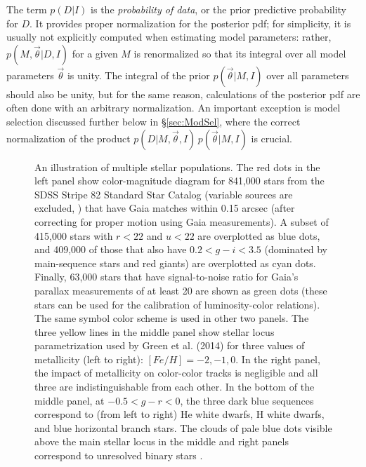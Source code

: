 The term $p(D|I)$ is the {\it probability of data}, or the prior predictive probability for $D$. 
It provides proper normalization for the posterior  pdf; for simplicity, it is usually not explicitly computed
when estimating model parameters: rather, $p(M,\vec{\theta}|D,I)$ for a given $M$
is renormalized so that
its integral over all model parameters $\vec{\theta}$ is unity.  The integral of the prior $p(\vec{\theta}|M,I)$
over all parameters should also be unity, but for the same reason, calculations of the posterior pdf are
often done with an arbitrary normalization. An important exception is model selection discussed further
below in \S\ref{sec:ModSel}, where the correct normalization of the product $p(D|M,\vec{\theta},I) \, p(\vec{\theta}|M,I)$ is crucial.  


\begin{figure}[t!]
\caption{An illustration of multiple stellar populations. The red dots in the left panel show color-magnitude diagram for 841,000 stars from the SDSS Stripe 82 Standard Star Catalog
(variable sources are excluded, \citealt{2021MNRAS.505.5941T}) that have Gaia matches within 0.15 arcsec (after correcting for proper motion using Gaia measurements). A subset of 415,000 stars with $r < 22$ and $u<22$ are overplotted as blue dots, and 409,000 of those that also have $0.2 < g-i < 3.5$ (dominated by main-sequence stars and red giants) are overplotted as cyan dots. Finally, 63,000 stars that have signal-to-noise ratio for Gaia’s parallax measurements of at least 20 are shown as green dots (these stars can be used for the calibration of luminosity-color relations). The same symbol color scheme is used in other two panels. The three yellow lines in the middle panel show stellar locus parametrization used by Green et al. (2014) for three values of metallicity (left to right): $[Fe/H] = -2, -1, 0$. In the right panel, the impact of metallicity on color-color tracks is negligible and all three are indistinguishable from each other. In the bottom of the middle panel, at $-0.5 < g-r < 0$, the three dark blue sequences correspond to (from left to right) He white dwarfs, H white dwarfs, and blue horizontal branch stars. The clouds of pale blue dots visible above the main stellar locus in the middle and right panels correspond to unresolved binary stars \citep{2004ApJ...615L.141S}.} \label{fig:3dataDiags}
\end{figure}



